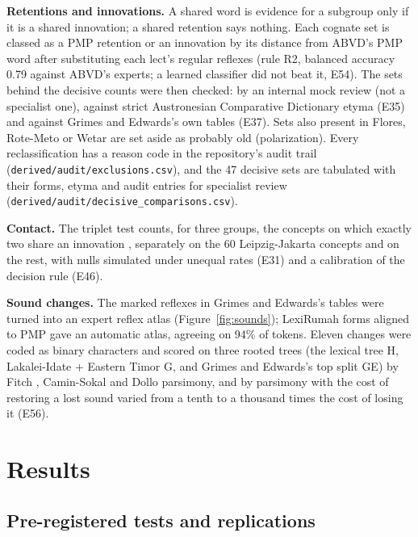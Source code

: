 \documentclass[11pt]{article}
\begin{document}
\textbf{Retentions and innovations.} A shared word is evidence for a subgroup only if it is a shared innovation; a shared retention says nothing. Each cognate set is classed as a PMP retention or an innovation by its distance from ABVD's PMP word after substituting each lect's regular reflexes (rule R2, balanced accuracy 0.79 against ABVD's experts; a learned classifier did not beat it, E54). The sets behind the decisive counts were then checked: by an internal mock review (not a specialist one), against strict Austronesian Comparative Dictionary etyma (E35) and against Grimes and Edwards's own tables (E37). Sets also present in Flores, Rote-Meto or Wetar are set aside as probably old (polarization). Every reclassification has a reason code in the repository's audit trail (\texttt{derived/audit/exclusions.csv}), and the 47 decisive sets are tabulated with their forms, etyma and audit entries for specialist review (\texttt{derived/audit/decisive\_comparisons.csv}).

\textbf{Contact.} The triplet test counts, for three groups, the concepts on which exactly two share an innovation \citep[the lexical counterpart of ABBA-BABA;][]{green2010,durand2011}, separately on the 60 Leipzig-Jakarta concepts \citep{tadmor2009} and on the rest, with nulls simulated under unequal rates (E31) and a calibration of the decision rule (E46).

\textbf{Sound changes.} The marked reflexes in Grimes and Edwards's tables were turned into an expert reflex atlas (Figure~\ref{fig:sounds}); LexiRumah forms aligned to PMP gave an automatic atlas, agreeing on 94\% of tokens. Eleven changes were coded as binary characters and scored on three rooted trees (the lexical tree H, Lakalei-Idate + Eastern Timor G, and Grimes and Edwards's top split GE) by Fitch \citep{fitch1971}, Camin-Sokal \citep{camin1965} and Dollo \citep{farris1977} parsimony, and by \citet{sankoff1975} parsimony with the cost of restoring a lost sound varied from a tenth to a thousand times the cost of losing it (E56).

\section{Results}

\subsection{Pre-registered tests and replications}
\end{document}
